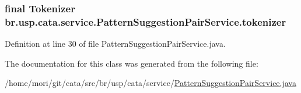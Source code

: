 \hypertarget{classbr_1_1usp_1_1cata_1_1service_1_1_pattern_suggestion_pair_service_af4f0977c652cc9553b245b6085caae00}{
\subsubsection[{tokenizer}]{\setlength{\rightskip}{0pt plus 5cm}final {\bf Tokenizer} br.\+usp.\+cata.\+service.\+Pattern\+Suggestion\+Pair\+Service.\+tokenizer\hspace{0.3cm}{\ttfamily [private]}}}\label{classbr_1_1usp_1_1cata_1_1service_1_1_pattern_suggestion_pair_service_af4f0977c652cc9553b245b6085caae00}


Definition at line 30 of file Pattern\+Suggestion\+Pair\+Service.\+java.



The documentation for this class was generated from the following file\+:\begin{DoxyCompactItemize}
\item 
/home/mori/git/cata/src/br/usp/cata/service/\hyperlink{_pattern_suggestion_pair_service_8java}{Pattern\+Suggestion\+Pair\+Service.\+java}\end{DoxyCompactItemize}
